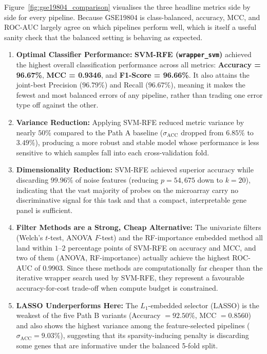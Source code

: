 Figure~\ref{fig:gse19804_comparison} visualises the three headline metrics side by side for every pipeline. Because GSE19804 is class-balanced, accuracy, MCC, and ROC-AUC largely agree on which pipelines perform well, which is itself a useful sanity check that the balanced setting is behaving as expected.

\begin{enumerate}
    \item \textbf{Optimal Classifier Performance:} \textbf{SVM-RFE (\texttt{wrapper\_svm})} achieved the highest overall classification performance across all metrics: \textbf{Accuracy = 96.67\%}, \textbf{MCC = 0.9346}, and \textbf{F1-Score = 96.66\%}. It also attains the joint-best Precision ($96.79\%$) and Recall ($96.67\%$), meaning it makes the fewest and most balanced errors of any pipeline, rather than trading one error type off against the other.
    \item \textbf{Variance Reduction:} Applying SVM-RFE reduced metric variance by nearly $50\%$ compared to the Path A baseline ($\sigma_{\text{ACC}}$ dropped from $6.85\%$ to $3.49\%$), producing a more robust and stable model whose performance is less sensitive to which samples fall into each cross-validation fold.
    \item \textbf{Dimensionality Reduction:} SVM-RFE achieved superior accuracy while discarding $99.96\%$ of noise features (reducing $p = 54{,}675$ down to $k = 20$), indicating that the vast majority of probes on the microarray carry no discriminative signal for this task and that a compact, interpretable gene panel is sufficient.
    \item \textbf{Filter Methods are a Strong, Cheap Alternative:} The univariate filters (Welch's $t$-test, ANOVA $F$-test) and the RF-importance embedded method all land within $1$--$2$ percentage points of SVM-RFE on accuracy and MCC, and two of them (ANOVA, RF-importance) actually achieve the highest ROC-AUC of $0.9903$. Since these methods are computationally far cheaper than the iterative wrapper search used by SVM-RFE, they represent a favourable accuracy-for-cost trade-off when compute budget is constrained.
    \item \textbf{LASSO Underperforms Here:} The $L_1$-embedded selector (LASSO) is the weakest of the five Path B variants (Accuracy $= 92.50\%$, MCC $= 0.8560$) and also shows the highest variance among the feature-selected pipelines ($\sigma_{\text{ACC}} = 9.03\%$), suggesting that its sparsity-inducing penalty is discarding some genes that are informative under the balanced 5-fold split.
\end{enumerate}


